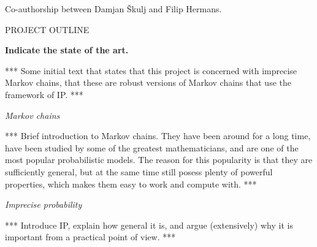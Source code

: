 \documentclass[11pt,dvipsnames,usenames,a4paper]{article}
\begin{document}
Co-authorship between Damjan Škulj and Filip Hermans.





\newpage
{}

\setcounter{page}{1}

\begin{shaded}\centering PROJECT OUTLINE \end{shaded}

\textbf{Indicate the state of the art.}

*** Some initial text that states that this project is concerned with imprecise Markov chains, that these are robust versions of Markov chains that use the framework of IP. ***

\emph{Markov chains}

*** Brief introduction to Markov chains. They have been around for a long time, have been studied by some of the greatest mathematicians, and are one of the most popular probabilistic models. The reason for this popularity is that they are sufficiently general, but at the same time still posess plenty of powerful properties, which makes them easy to work and compute with. ***

\emph{Imprecise probability}

*** Introduce IP, explain how general it is, and argue (extensively) why it is important from a practical point of view. ***
\end{document}
